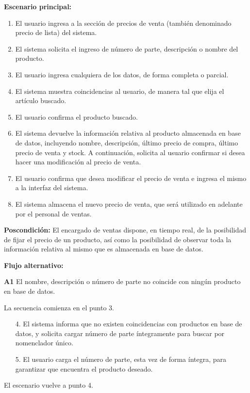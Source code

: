 \textbf{Escenario principal:}
\begin{enumerate}
	\item El usuario ingresa a la sección de precios de venta (también denominado precio de lista) del sistema.
	\item El sistema solicita el ingreso de número de parte, descripción o nombre del producto.
	\item El usuario ingresa cualquiera de los datos, de forma completa o parcial.
	\item El sistema muestra coincidencias al usuario, de manera tal que elija el artículo buscado.
	\item El usuario confirma el producto buscado.
	\item El sistema devuelve la información relativa al producto almacenada en base de datos,
	incluyendo nombre, descripción, último precio de compra, último precio de venta y stock.
	A continuación, solicita al usuario confirmar si desea hacer una modificación al precio de venta.
	\item El usuario confirma que desea modificar el precio de venta e ingresa el mismo a la interfaz del sistema.
	\item El sistema almacena el nuevo precio de venta, que será utilizado en adelante por el personal de ventas.
\end{enumerate}

\textbf{Poscondición:}
El encargado de ventas dispone, en tiempo real,
de la posibilidad de fijar el precio de un producto,
así como la posibilidad de observar toda la información relativa al mismo que es almacenada en base de datos.

\textbf{Flujo alternativo:}

\textbf{A1} El nombre, descripción o número de parte no coincide con ningún producto en base de datos.

La secuencia comienza en el punto 3.

\begin{enumerate}
	\item[4.] El sistema informa que no existen coincidencias con productos en base de datos,
	y solicita cargar número de parte íntegramente para buscar por nomenclador único.
	\item[5.] El usuario carga el número de parte, esta vez de forma íntegra,
	para garantizar que encuentra el producto deseado.
\end{enumerate}

El escenario vuelve a punto 4.

